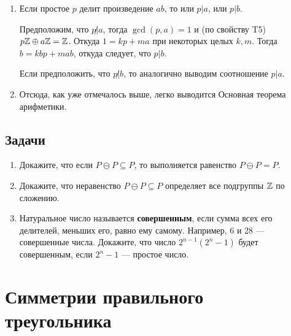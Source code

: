 \begin{enumerate}[T1]
\item Если простое $p$ делит произведение $ab$, то или $p|a$, или $p|b$.

Предположим, что $p\not|a$, тогда $\gcd(p,a)=1$ и (по свойству T5) $p\mathbb Z\oplus a\mathbb Z=\mathbb Z$. Откуда $1=kp+ma$ при некоторых целых $k,m$. Тогда $b=kbp+mab$, откуда следует, что $p|b$.

Если предположить, что $p\not|b$, то аналогично выводим соотношение $p|a$.
\item Отсюда, как уже отмечалось выше, легко выводится Основная теорема арифметики.
\end{enumerate}


\subsection{Задачи}
\begin{enumerate}
\item Докажите, что если $P\ominus P\subseteq P$, то выполняется равенство $P\ominus P=P$.
\item Докажите, что неравенство $P\ominus P\subseteq P$ определяет все подгруппы $\mathbb Z$ по сложению.
\item Натуральное число называется \textbf{совершенным}, если сумма всех его делителей, меньших его, равно ему самому. Например, 6 и 28 --- совершенные числа. Докажите, что число $2^{n-1}(2^n-1)$ будет совершенным, если $2^n-1$ --- простое число.
\end{enumerate}





\section{Симметрии правильного треугольника}

